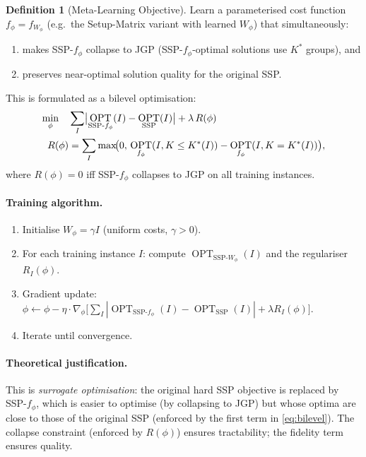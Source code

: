 \documentclass[11pt,a4paper]{article}
\theoremstyle{plain}
\theoremstyle{definition}
\newtheorem{definition}[theorem]{Definition}
\DeclareMathOperator{\OPT}{OPT}
\newcommand{\Kstar}{K^{*}}          %
\begin{document}
\begin{definition}[Meta-Learning Objective]
Learn a parameterised cost function $f_\phi = f_{W_\phi}$ (e.g.\ the Setup-Matrix variant
with learned $W_\phi$) that simultaneously:
\begin{enumerate}[label=(\roman*)]
  \item makes SSP-$f_\phi$ collapse to JGP (SSP-$f_\phi$-optimal solutions use $\Kstar$ groups), and
  \item preserves near-optimal solution quality for the original SSP.
\end{enumerate}
\end{definition}

This is formulated as a bilevel optimisation:
\begin{align}
  \min_\phi \quad
  & \sum_I \bigl|\OPT_{\mathrm{SSP}\text{-}f_\phi}(I) - \OPT_{\mathrm{SSP}}(I)\bigr|
    + \lambda\, R(\phi) \notag\\
  R(\phi) &= \sum_I \max\!\bigl(0,\,
    \OPT_{f_\phi}(I, K \le \Kstar(I)) - \OPT_{f_\phi}(I, K = \Kstar(I))\bigr),
    \label{eq:bilevel}
\end{align}
where $R(\phi) = 0$ iff SSP-$f_\phi$ collapses to JGP on all training instances.

\paragraph{Training algorithm.}
\begin{enumerate}[label=\arabic*.]
  \item Initialise $W_\phi = \gamma I$ (uniform costs, $\gamma > 0$).
  \item For each training instance $I$: compute $\OPT_{\mathrm{SSP}\text{-}W_\phi}(I)$
        and the regulariser $R_I(\phi)$.
  \item Gradient update:
        $\phi \leftarrow \phi - \eta \cdot \nabla_\phi
        \bigl[\sum_I |\OPT_{\mathrm{SSP}\text{-}f_\phi}(I) - \OPT_{\mathrm{SSP}}(I)| + \lambda R_I(\phi)\bigr]$.
  \item Iterate until convergence.
\end{enumerate}

\paragraph{Theoretical justification.}
This is \emph{surrogate optimisation}: the original hard SSP objective is replaced by
SSP-$f_\phi$, which is easier to optimise (by collapsing to JGP) but whose optima are
close to those of the original SSP (enforced by the first term in \eqref{eq:bilevel}).
The collapse constraint (enforced by $R(\phi)$) ensures tractability; the fidelity term
ensures quality.
\end{document}
